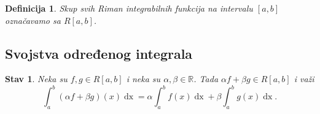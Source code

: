 \documentclass{article}
\newtheorem{definicija}{Definicija}[section]
\newtheorem{stav}{Stav}[section]
\DeclareMathOperator{\dx}{dx}
\begin{document}
\begin{defbox}
    \label{definicija_2.9}
    \begin{definicija}
        Skup svih Riman integrabilnih funkcija na intervalu $\left[a,b\right]$ označavamo sa $R\left[a, b\right]$.
    \end{definicija}
\end{defbox}

\subsection{Svojstva određenog integrala}

\begin{stavbox}
    \label{stav_2.4}
    \begin{stav}
        Neka su $f, g \in R\left[a, b\right]$ i neka su $\alpha, \beta \in \mathbb{R}$. Tada
        $\alpha f +\beta g \in R\left[a, b\right]$ i važi
        $$\displaystyle \int^b_a\left(\alpha f + \beta g\right)\left(x\right)\dx = \alpha\int^b_af\left(x\right)\dx + \beta\int^b_ag\left(x\right)\dx.$$
    \end{stav}
\end{stavbox}
\end{document}
